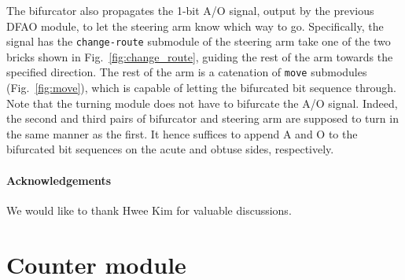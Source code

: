 \documentclass[runningheads]{llncs}
\begin{document}
The bifurcator also propagates the 1-bit A/O signal, output by the previous DFAO module, to let the steering arm know which way to go. 
Specifically, the signal has the \texttt{change-route} submodule of the steering arm take one of the two bricks shown in Fig.~\ref{fig:change_route}, guiding the rest of the arm towards the specified direction. 
The rest of the arm is a catenation of \texttt{move} submodules (Fig.~\ref{fig:move}), which is capable of letting the bifurcated bit sequence through. 
Note that the turning module does not have to bifurcate the A/O signal. 
Indeed, the second and third pairs of bifurcator and steering arm are supposed to turn in the same manner as the first. 
It hence suffices to append A and O to the bifurcated bit sequences on the acute and obtuse sides, respectively. 

\paragraph{Acknowledgements} 
We would like to thank Hwee Kim for valuable discussions. 


	
	

	\newpage
	\appendix



	\section{Counter module}
	\label{sect:appendix_counter_module}
\end{document}
